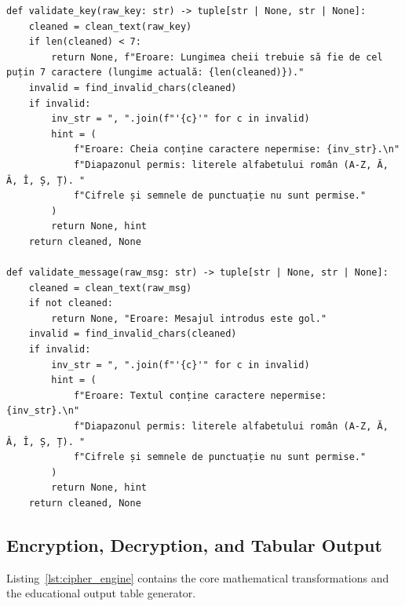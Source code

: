 \documentclass[11pt,a4paper]{article}
\begin{document}
\begin{lstlisting}[style=pythoncode,caption={Validation functions for key and message},label={lst:validation}]
def validate_key(raw_key: str) -> tuple[str | None, str | None]:
    cleaned = clean_text(raw_key)
    if len(cleaned) < 7:
        return None, f"Eroare: Lungimea cheii trebuie să fie de cel puțin 7 caractere (lungime actuală: {len(cleaned)})."
    invalid = find_invalid_chars(cleaned)
    if invalid:
        inv_str = ", ".join(f"'{c}'" for c in invalid)
        hint = (
            f"Eroare: Cheia conține caractere nepermise: {inv_str}.\n"
            f"Diapazonul permis: literele alfabetului român (A-Z, Ă, Â, Î, Ș, Ț). "
            f"Cifrele și semnele de punctuație nu sunt permise."
        )
        return None, hint
    return cleaned, None

def validate_message(raw_msg: str) -> tuple[str | None, str | None]:
    cleaned = clean_text(raw_msg)
    if not cleaned:
        return None, "Eroare: Mesajul introdus este gol."
    invalid = find_invalid_chars(cleaned)
    if invalid:
        inv_str = ", ".join(f"'{c}'" for c in invalid)
        hint = (
            f"Eroare: Textul conține caractere nepermise: {inv_str}.\n"
            f"Diapazonul permis: literele alfabetului român (A-Z, Ă, Â, Î, Ș, Ț). "
            f"Cifrele și semnele de punctuație nu sunt permise."
        )
        return None, hint
    return cleaned, None
\end{lstlisting}

\newpage
\subsection{Encryption, Decryption, and Tabular Output}

Listing~\ref{lst:cipher_engine} contains the core mathematical transformations and the educational output table generator.
\end{document}
